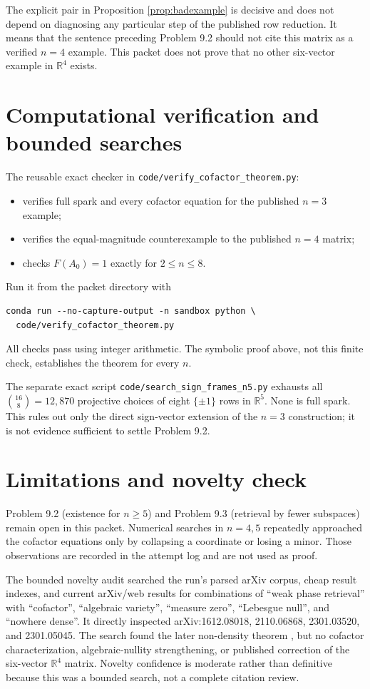 \documentclass[11pt]{article}
\newcommand{\R}{\mathbb{R}}
\begin{document}
The explicit pair in Proposition \ref{prop:badexample} is decisive and does
not depend on diagnosing any particular step of the published row reduction.
It means that the sentence preceding Problem 9.2 should not cite this matrix
as a verified $n=4$ example.  This packet does not prove that no other
six-vector example in $\R^4$ exists.

\section{Computational verification and bounded searches}

The reusable exact checker in \texttt{code/verify\_cofactor\_theorem.py}:
\begin{itemize}
\item verifies full spark and every cofactor equation for the published
$n=3$ example;
\item verifies the equal-magnitude counterexample to the published $n=4$
matrix;
\item checks $F(A_0)=1$ exactly for $2\leq n\leq8$.
\end{itemize}
Run it from the packet directory with
\begin{verbatim}
conda run --no-capture-output -n sandbox python \
  code/verify_cofactor_theorem.py
\end{verbatim}
All checks pass using integer arithmetic.  The symbolic proof above, not this
finite check, establishes the theorem for every $n$.

The separate exact script \texttt{code/search\_sign\_frames\_n5.py} exhausts
all $\binom{16}{8}=12{,}870$ projective choices of eight $\{\pm1\}$ rows in
$\R^5$.  None is full spark.  This rules out only the direct sign-vector
extension of the $n=3$ construction; it is not evidence sufficient to settle
Problem 9.2.

\section{Limitations and novelty check}

Problem 9.2 (existence for $n\geq5$) and Problem 9.3 (retrieval by fewer
subspaces) remain open in this packet.  Numerical searches in $n=4,5$ repeatedly
approached the cofactor equations only by collapsing a coordinate or losing a
minor.  Those observations are recorded in the attempt log and are not used as
proof.

The bounded novelty audit searched the run's parsed arXiv corpus, cheap result
indexes, and current arXiv/web results for combinations of
``weak phase retrieval'' with ``cofactor'', ``algebraic variety'',
``measure zero'', ``Lebesgue null'', and ``nowhere dense''.  It directly
inspected arXiv:1612.08018, 2110.06868, 2301.03520, and 2301.05045.  The search
found the later non-density theorem \cite{CASAZZA2023}, but no cofactor
characterization, algebraic-nullity strengthening, or published correction of
the six-vector $\R^4$ matrix.  Novelty confidence is moderate rather than
definitive because this was a bounded search, not a complete citation review.
\end{document}
